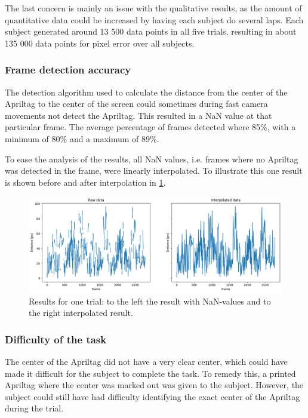 \documentclass[nofilelist]{cslthse-msc}
\begin{document}
The last concern is mainly an issue with the qualitative results, as the amount of quantitative data could be increased by having each subject do several laps. Each subject generated around 13 500 data points in all five trials, resulting in about 135 000 data points for pixel error over all subjects.

\subsubsection{Frame detection accuracy}
The detection algorithm used to calculate the distance from the center of the Apriltag to the center of the screen could sometimes during fast camera movements not detect the Apriltag. This resulted in a NaN value at that particular frame. The average percentage of frames detected where 85\%, with a minimum of 80\% and a maximum of 89\%.

To ease the analysis of the results, all NaN values, i.e. frames where no Apriltag was detected in the frame, were linearly interpolated. To illustrate this one result is shown before and after interpolation in \ref{fig:raw-vs-interpolated}. 

\begin{figure}[!hbt]
   \centering
   \includegraphics[scale=0.5]{images/raw-vs-interpolated.png} 
   \caption{Results for one trial: to the left the result with NaN-values and to the right interpolated result.}
   \label{fig:raw-vs-interpolated}
\end{figure}

\subsubsection{Difficulty of the task}
The center of the Apriltag did not have a very clear center, which could have made it difficult for the subject to complete the task. To remedy this, a printed Apriltag where the center was marked out was given to the subject. However, the subject could still have had difficulty identifying the exact center of the Apriltag during the trial.
\end{document}
